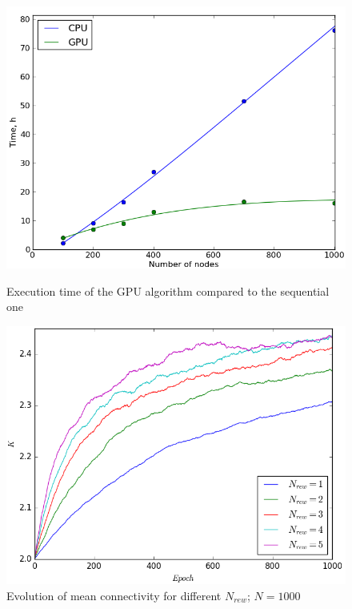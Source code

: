 \documentclass[procedia]{easychair}
\begin{document}
	\begin{figure}[ht!]
		\begin{minipage}[t]{0.45\textwidth}
			\includegraphics[width=1.0\textwidth]{plots/speedup}
			\caption{Execution time of the GPU algorithm compared to the sequential one}
			\label{fig:speedup}
		\end{minipage}\hfill
		\begin{minipage}[t]{0.45\textwidth}
			\includegraphics[width=1.0\textwidth]{plots/n_rew}
			\caption{Evolution of mean connectivity for different $N_{rew}$; $N=1000$}
			\label{fig:nrew}
		\end{minipage}
	\end{figure}
	
\end{document}
